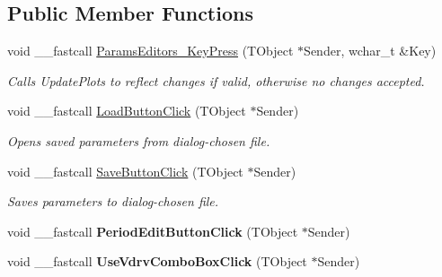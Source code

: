 \subsection*{Public Member Functions}
\begin{DoxyCompactItemize}
\item 
\hypertarget{class_t_h_h_current_form_a1e5dcab20fa6d9eae39835085ac923f0}{void \+\_\+\+\_\+fastcall \hyperlink{class_t_h_h_current_form_a1e5dcab20fa6d9eae39835085ac923f0}{Params\+Editors\+\_\+\+Key\+Press} (T\+Object $\ast$Sender, wchar\+\_\+t \&Key)}\label{class_t_h_h_current_form_a1e5dcab20fa6d9eae39835085ac923f0}

\begin{DoxyCompactList}\small\item\em Calls Update\+Plots to reflect changes if valid, otherwise no changes accepted. \end{DoxyCompactList}\item 
\hypertarget{class_t_h_h_current_form_a7c2279508a7f4d1eb1c2a73c64f75acf}{void \+\_\+\+\_\+fastcall \hyperlink{class_t_h_h_current_form_a7c2279508a7f4d1eb1c2a73c64f75acf}{Load\+Button\+Click} (T\+Object $\ast$Sender)}\label{class_t_h_h_current_form_a7c2279508a7f4d1eb1c2a73c64f75acf}

\begin{DoxyCompactList}\small\item\em Opens saved parameters from dialog-\/chosen file. \end{DoxyCompactList}\item 
\hypertarget{class_t_h_h_current_form_a0e30e6f1106039c94115d0e8b1b8add8}{void \+\_\+\+\_\+fastcall \hyperlink{class_t_h_h_current_form_a0e30e6f1106039c94115d0e8b1b8add8}{Save\+Button\+Click} (T\+Object $\ast$Sender)}\label{class_t_h_h_current_form_a0e30e6f1106039c94115d0e8b1b8add8}

\begin{DoxyCompactList}\small\item\em Saves parameters to dialog-\/chosen file. \end{DoxyCompactList}\item 
\hypertarget{class_t_h_h_current_form_a48809e8ad50543c9e2e293eea6847039}{void \+\_\+\+\_\+fastcall {\bfseries Period\+Edit\+Button\+Click} (T\+Object $\ast$Sender)}\label{class_t_h_h_current_form_a48809e8ad50543c9e2e293eea6847039}

\item 
\hypertarget{class_t_h_h_current_form_a0d9286e27a4db14216faac7ce1f802a2}{void \+\_\+\+\_\+fastcall {\bfseries Use\+Vdrv\+Combo\+Box\+Click} (T\+Object $\ast$Sender)}\label{class_t_h_h_current_form_a0d9286e27a4db14216faac7ce1f802a2}


\end{DoxyCompactItemize}
